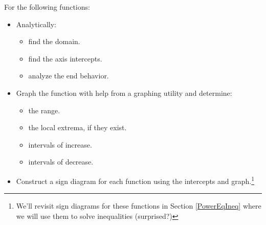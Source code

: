 \documentclass{ximera}
\begin{document}
\begin{example}  \label{rootradicalfcnex} For the following functions:

\begin{itemize}

\item Analytically:

\begin{multicols}{3}

\begin{itemize}

\item find the domain.

\item find the axis intercepts.

\item analyze the end behavior.

\end{itemize}

\end{multicols}

\newpage

\item Graph the function with help from a graphing utility and determine:

\begin{multicols}{2}

\begin{itemize}

\item  the range.

\item the local extrema, if they exist.

\end{itemize}

\end{multicols}

\begin{multicols}{2}

\begin{itemize}

\item intervals of increase.

\item intervals of decrease.

\end{itemize}

\end{multicols}

\item Construct a sign diagram for each function using the intercepts and graph.\footnote{We'll revisit sign diagrams for these functions in Section \ref{PowerEqIneq} where we will use them to solve inequalities (surprised?)}


\end{itemize}
\end{example}
\end{document}
